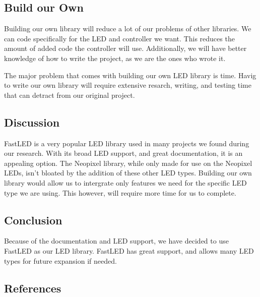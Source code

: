 \documentclass[onecolumn, draftclsnofoot,10pt, compsoc]{IEEEtran}
\begin{document}
		\subsection{Build our Own}
		\noindent Building our own library will reduce a lot of our problems of other
		libraries. We can code specifically for the LED and controller we want.
		This reduces the amount of added code the controller will use. Additionally,
		we will have better knowledge of how to write the project, as we are the
		ones who wrote it.

		\vspace{5mm}
		\noindent The major problem that comes with building our own LED library is time.
		Havig to write our own library will require extensive resarch, writing, and
		testing time that can detract from our original project.
		\subsection{Discussion}
		\noindent FastLED is a very popular LED library used in many projects we found
		during our research. With its broad LED support, and great documentation,
		it is an appealing option. The Neopixel library, while only made for use on
		the Neopixel LEDs, isn't bloated by the addition of these other LED types.
		Building our own library would allow us to intergrate only features we need
		for the specific LED type we are using. This however, will require more
		time for us to complete.
		\subsection{Conclusion}
		\noindent Because of the documentation and LED support, we have decided to use
		FastLED as our LED library. FastLED has great support, and allows many LED
		types for future expansion if needed.

		\newpage
				\subsection{References}

				\begingroup
					\renewcommand{\addcontentsline}[3]{}%
					\renewcommand{\section}[2]{}%

					
					

				\endgroup
				\newpage
	
\end{document}
